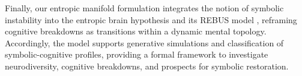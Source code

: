 Finally, our entropic manifold formulation integrates the notion of symbolic instability into the entropic brain hypothesis \cite{carhart2014entropic} and its REBUS model \cite{carhart2019rebus}, reframing cognitive breakdowns as transitions within a dynamic mental topology. Accordingly, the model supports generative simulations and classification of symbolic-cognitive profiles, providing a formal framework to investigate neurodiversity, cognitive breakdowns, and prospects for symbolic restoration.
